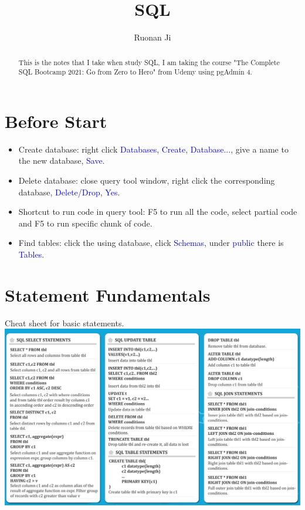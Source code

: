 \documentclass[a4paper]{article}
\title{SQL}
\author{Ruonan Ji}
\begin{document}
\maketitle

\begin{abstract}
This is the notes that I take when study SQL, I am taking the course "The Complete SQL Bootcamp 2021: Go from Zero to Hero" from Udemy using pgAdmin 4.
\end{abstract}

\section{Before Start}

\begin{itemize}
  \item Create database: right click \textcolor{blue}{Databases}, \textcolor{blue}{Create}, \textcolor{blue}{Database...}, give a name to the new database, \textcolor{blue}{Save}.
  \item Delete database: close query tool window, right click the corresponding database, \textcolor{blue}{Delete/Drop}, \textcolor{blue}{Yes}.
  \item Shortcut to run code in query tool: F5 to run all the code, select partial code and F5 to run specific chunk of code.
  \item Find tables: click the using database, click \textcolor{blue}{Schemas}, under \textcolor{blue}{public} there is \textcolor{blue}{Tables}.
\end{itemize}

\section{Statement Fundamentals}
Cheat sheet for basic statements.\\
\newline
\includegraphics[scale=0.47]{cheat_sheet.png}
\end{document}
